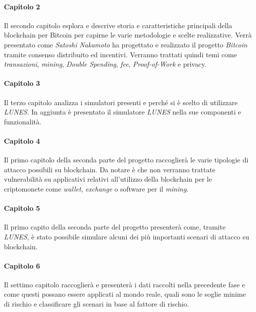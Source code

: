 \paragraph{Capitolo 2}
Il secondo capitolo esplora e descrive storia e caratteristiche principali della blockchain per Bitcoin per capirne le varie metodologie e scelte realizzative. Verrà presentato come \textit{Satoshi Nakamoto} ha progettato e realizzato il progetto \textit{Bitcoin} tramite consenso distribuito ed incentivi. Verranno trattati quindi temi come \textit{transazioni}, \textit{mining}, \textit{Double Spending}, \textit{fee}, \textit{Proof-of-Work} e privacy.

\paragraph{Capitolo 3}
Il terzo capitolo analizza i simulatori presenti e perché si è scelto di utilizzare \textit{LUNES}.
In aggiunta è presentato il simulatore \textit{LUNES} nella sue componenti e funzionalità.

\paragraph{Capitolo 4}
Il primo capitolo della seconda parte del progetto raccoglierà le varie tipologie di attacco possibili su blockchain. Da notare è che non verranno trattate vulnerabilità su applicativi relativi all'utilizzo della blockchain per le criptomonete come \textit{wallet}, \textit{exchange} o software per il \textit{mining}.

\paragraph{Capitolo 5}
Il primo capito della seconda parte del progetto presenterà come, tramite \textit{LUNES}, è stato possibile simulare alcuni dei più importanti scenari di attacco su blockchain.

\paragraph{Capitolo 6}
Il settimo capitolo raccoglierà e presenterà i dati raccolti nella precedente fase e come questi possano essere applicati al mondo reale, quali sono le soglie minime di rischio e classificare gli scenari in base al fattore di rischio.

